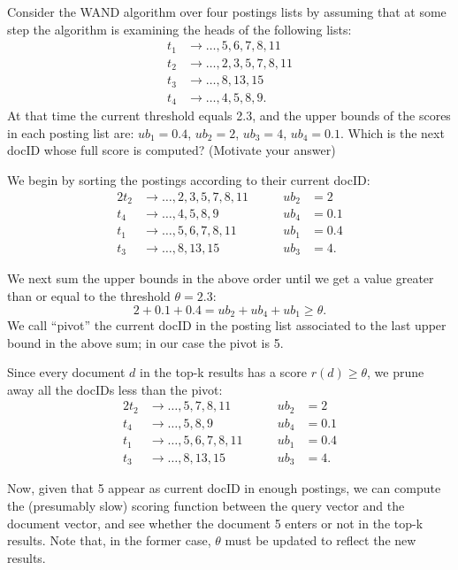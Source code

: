 \exercise

Consider the WAND algorithm over four postings lists by assuming that at some
step the algorithm is examining the heads of the following lists:
\begin{align*}
  t_1 & \rightarrow \dots, 5, 6, 7, 8, 11    \\
  t_2 & \rightarrow \dots, 2, 3, 5, 7, 8, 11 \\
  t_3 & \rightarrow \dots, 8, 13, 15         \\
  t_4 & \rightarrow \dots, 4, 5, 8, 9. 
\end{align*}
%
At that time the current threshold equals 2.3, and the upper bounds of the
scores in each posting list are: $ub_1 = 0.4$, $ub_2 = 2$, $ub_3 = 4$,
$ub_4 = 0.1$. Which is the next docID whose full score is computed? (Motivate
your answer)

\solution

We begin by sorting the postings according to their current docID:
%
\begin{alignat*}{2}
  t_2 & \rightarrow \dots, 2, 3, 5, 7, 8, 11 \qquad & ub_2 &= 2    \\  
  t_4 & \rightarrow \dots, 4, 5, 8, 9               & ub_4 &= 0.1  \\  
  t_1 & \rightarrow \dots, 5, 6, 7, 8, 11           & ub_1 &= 0.4  \\
  t_3 & \rightarrow \dots, 8, 13, 15                & ub_3 &= 4.
\end{alignat*}

We next sum the upper bounds in the above order until we get a value greater
than or equal to the threshold $\theta=2.3$:
%
$$2 + 0.1 + 0.4 = ub_2 + ub_4 + ub_1 \geq \theta.$$
%
We call ``pivot'' the current docID in the posting list associated to the
last upper bound in the above sum; in our case the pivot is 5.

Since every document $d$ in the top-k results has a score $r(d) \geq \theta$,
we prune away all the docIDs less than the pivot:
%
\begin{alignat*}{2}
  t_2 & \rightarrow \dots, 5, 7, 8, 11           & ub_2 &= 2    \\  
  t_4 & \rightarrow \dots, 5, 8, 9               & ub_4 &= 0.1  \\  
  t_1 & \rightarrow \dots, 5, 6, 7, 8, 11 \qquad & ub_1 &= 0.4  \\
  t_3 & \rightarrow \dots, 8, 13, 15             & ub_3 &= 4.
\end{alignat*}

Now, given that 5 appear as current docID in enough postings, we can compute
the (presumably slow) scoring function between the query vector and the document
vector, and see whether the document 5 enters or not in the top-k results. Note
that, in the former case, $\theta$ must be updated to reflect the new results.